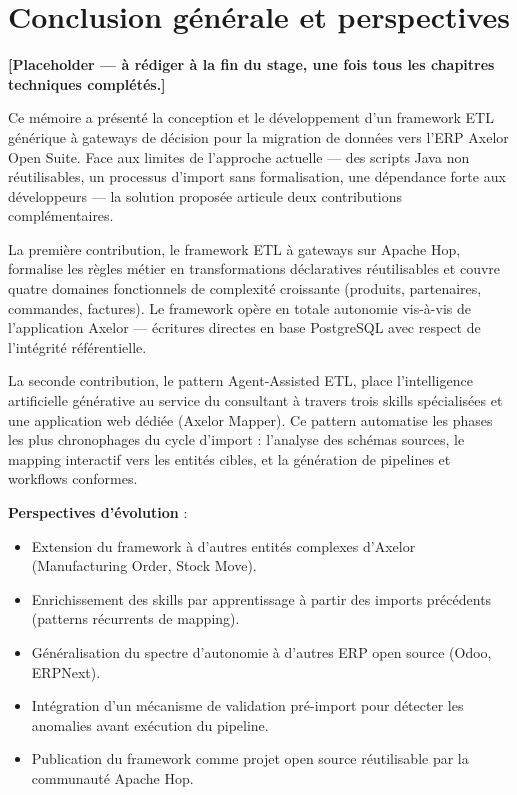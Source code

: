 \documentclass[a4paper,12pt]{article}
\begin{document}
\newpage
\section*{Conclusion générale et perspectives}

\textbf{[Placeholder — à rédiger à la fin du stage, une fois tous les chapitres techniques complétés.]}

\medskip
Ce mémoire a présenté la conception et le développement d'un framework ETL générique à gateways de décision pour la migration de données vers l'ERP Axelor Open Suite. Face aux limites de l'approche actuelle — des scripts Java non réutilisables, un processus d'import sans formalisation, une dépendance forte aux développeurs — la solution proposée articule deux contributions complémentaires.

La première contribution, le framework ETL à gateways sur Apache Hop, formalise les règles métier en transformations déclaratives réutilisables et couvre quatre domaines fonctionnels de complexité croissante (produits, partenaires, commandes, factures). Le framework opère en totale autonomie vis-à-vis de l'application Axelor — écritures directes en base PostgreSQL avec respect de l'intégrité référentielle.

La seconde contribution, le pattern Agent-Assisted ETL, place l'intelligence artificielle générative au service du consultant à travers trois skills spécialisées et une application web dédiée (Axelor Mapper). Ce pattern automatise les phases les plus chronophages du cycle d'import : l'analyse des schémas sources, le mapping interactif vers les entités cibles, et la génération de pipelines et workflows conformes.

\medskip
\textbf{Perspectives d'évolution} :

\begin{itemize}
  \item Extension du framework à d'autres entités complexes d'Axelor (Manufacturing Order, Stock Move).
  \item Enrichissement des skills par apprentissage à partir des imports précédents (patterns récurrents de mapping).
  \item Généralisation du spectre d'autonomie à d'autres ERP open source (Odoo, ERPNext).
  \item Intégration d'un mécanisme de validation pré-import pour détecter les anomalies avant exécution du pipeline.
  \item Publication du framework comme projet open source réutilisable par la communauté Apache Hop.
\end{itemize}
\end{document}
